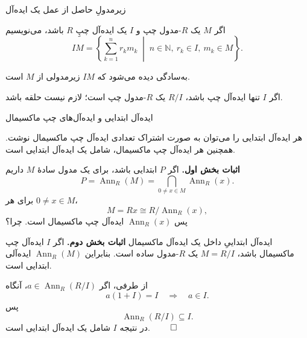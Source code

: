\begin{frame}[t]{زیرمدولِ حاصل از عمل یک ایده‌آل}
\label{lec15:ideal-times-module}
\begin{definition}
اگر \(M\) یک \(R\)-مدول چپ و \(I\) یک ایده‌آل چپِ \(R\) باشد، می‌نویسیم
\[
 IM=\left\{\sum_{k=1}^{n}r_km_k\;\middle|\;
 n\in\mathbb N,\ r_k\in I,\ m_k\in M\right\}.
\]
\end{definition}
به‌سادگی دیده می‌شود که \(IM\) زیرمدولی از \(M\) است.
\begin{remark}
اگر \(I\) تنها ایده‌آل چپ باشد، \(R/I\) یک \(R\)-مدول چپ است؛ لازم نیست حلقه باشد.
\end{remark}
\end{frame}

\begin{frame}[t]{ایده‌آل ابتدایی و ایده‌آل‌های چپ ماکسیمال}
\label{lec15:primitive-intersection}
\begin{lemma}
هر ایده‌آل ابتدایی را می‌توان به صورت اشتراک تعدادی ایده‌آل چپ ماکسیمال نوشت.
همچنین هر ایده‌آل چپ ماکسیمال، شامل یک ایده‌آل ابتدایی است.
\end{lemma}
\textbf{اثبات بخش اول.} اگر \(P\) ابتدایی باشد، برای یک مدول سادهٔ \(M\) داریم
\[
 P=\operatorname{Ann}_R(M)
 =\bigcap_{0\ne x\in M}\operatorname{Ann}_R(x).
\]
برای هر \(0\ne x\in M\)،
\[
 M=Rx\cong R/\operatorname{Ann}_R(x),
\]
پس \(\operatorname{Ann}_R(x)\) ایده‌آل چپ ماکسیمال است. \alert{چرا؟}
\end{frame}

\begin{frame}[t]{ایده‌آل ابتداییِ داخل یک ایده‌آل ماکسیمال}
\label{lec15:maximal-contains-primitive}
\textbf{اثبات بخش دوم.} اگر \(I\) ایده‌آل چپ ماکسیمال باشد، \(M=R/I\) یک \(R\)-مدول ساده است.
بنابراین \(\operatorname{Ann}_R(M)\) ایده‌آلی ابتدایی است.
\medskip

از طرفی، اگر \(a\in\operatorname{Ann}_R(R/I)\)، آنگاه
\[
 a(1+I)=I\quad\Longrightarrow\quad a\in I.
\]
پس
\[
 \operatorname{Ann}_R(R/I)\subseteq I.
\]
در نتیجه \(I\) شامل یک ایده‌آل ابتدایی است. \hfill\(\qed\)
\end{frame}

